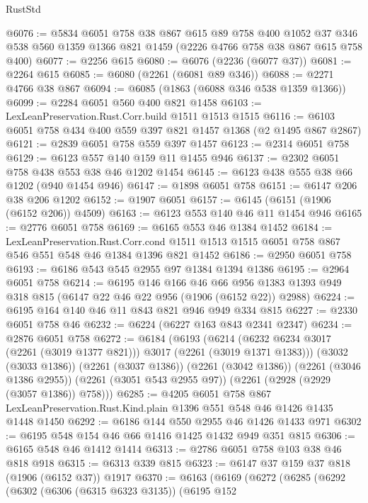 \begin{lexlean}{RustStd}
\begin{coremodule}
@6076 := @5834
    @6051
    @758
    @38
    @867
    @615
    @89
    @758
    @400
    @1052
    @37
    @346
    @538
    @560
    @1359
    @1366
    @821
    @1459
    (@2226 @4766 @758 @38 @867 @615 @758 @400)
@6077 := @2256 @615
@6080 := @6076 (@2236 (@6077 @37))
@6081 := @2264 @615
@6085 := @6080 (@2261 (@6081 @89 @346))
@6088 := @2271 @4766 @38 @867
@6094 := @6085 (@1863 (@6088 @346 @538 @1359 @1366))
@6099 := @2284 @6051 @560 @400 @821 @1458
@6103 := LexLeanPreservation.Rust.Corr.build @1511 @1513 @1515
@6116 := @6103 @6051 @758 @434 @400 @559 @397 @821 @1457 @1368 (@2 @1495 @867 @2867)
@6121 := @2839 @6051 @758 @559 @397 @1457
@6123 := @2314 @6051 @758
@6129 := @6123 @557 @140 @159 @11 @1455 @946
@6137 := @2302 @6051 @758 @438 @553 @38 @46 @1202 @1454
@6145 := @6123 @438 @555 @38 @66 @1202 (@940 @1454 @946)
@6147 := @1898 @6051 @758
@6151 := @6147 @206 @38 @206 @1202
@6152 := @1907 @6051
@6157 := @6145 (@6151 (@1906 (@6152 @206)) @4509)
@6163 := @6123 @553 @140 @46 @11 @1454 @946
@6165 := @2776 @6051 @758
@6169 := @6165 @553 @46 @1384 @1452
@6184 := LexLeanPreservation.Rust.Corr.cond
    @1511
    @1513
    @1515
    @6051
    @758
    @867
    @546
    @551
    @548
    @46
    @1384
    @1396
    @821
    @1452
@6186 := @2950 @6051 @758
@6193 := @6186 @543 @545 @2955 @97 @1384 @1394 @1386
@6195 := @2964 @6051 @758
@6214 := @6195
    @146
    @166
    @46
    @66
    @956
    @1383
    @1393
    @949
    @318
    @815
    (@6147 @22 @46 @22 @956 (@1906 (@6152 @22)) @2988)
@6224 := @6195 @164 @140 @46 @11 @843 @821 @946 @949 @334 @815
@6227 := @2330 @6051 @758 @46
@6232 := @6224 (@6227 @163 @843 @2341 @2347)
@6234 := @2876 @6051 @758
@6272 := @6184
    (@6193
      (@6214 (@6232 @6234 @3017 (@2261 (@3019 @1377 @821))) @3017 (@2261 (@3019 @1371 @1383)))
      (@3032 (@3033 @1386))
      (@2261 (@3037 @1386))
      (@2261 (@3042 @1386))
      (@2261 (@3046 @1386 @2955))
      (@2261 (@3051 @543 @2955 @97))
      (@2261 (@2928 (@2929 (@3057 @1386)) @758)))
@6285 := @4205
    @6051
    @758
    @867
    LexLeanPreservation.Rust.Kind.plain
    @1396
    @551
    @548
    @46
    @1426
    @1435
    @1448
    @1450
@6292 := @6186 @144 @550 @2955 @46 @1426 @1433 @971
@6302 := @6195 @548 @154 @46 @66 @1416 @1425 @1432 @949 @351 @815
@6306 := @6165 @548 @46 @1412 @1414
@6313 := @2786 @6051 @758 @103 @38 @46 @818 @918
@6315 := @6313 @339 @815
@6323 := @6147 @37 @159 @37 @818 (@1906 (@6152 @37)) @1917
@6370 := @6163
    (@6169
      (@6272
        (@6285
          (@6292
            (@6302
              (@6306 (@6315 @6323 @3135))
              (@6195
                @152

\end{coremodule}
\end{lexlean}
